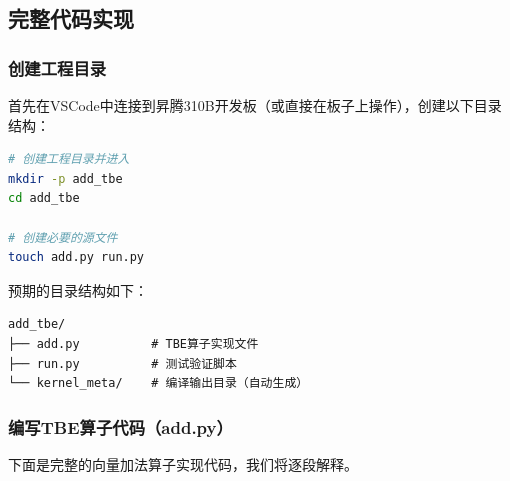 \subsection{完整代码实现}\label{src-book-chapter7-h19}

\subsubsection{创建工程目录}\label{src-book-chapter7-h20}

首先在VSCode中连接到昇腾310B开发板（或直接在板子上操作），创建以下目录结构：

\begin{lstlisting}[language=bash]
# 创建工程目录并进入
mkdir -p add_tbe
cd add_tbe

# 创建必要的源文件
touch add.py run.py
\end{lstlisting}

预期的目录结构如下：

\begin{lstlisting}
add_tbe/
├── add.py          # TBE算子实现文件
├── run.py          # 测试验证脚本
└── kernel_meta/    # 编译输出目录（自动生成）
\end{lstlisting}

\subsubsection{编写TBE算子代码（add.py）}\label{src-book-chapter7-h21}

下面是完整的向量加法算子实现代码，我们将逐段解释。

